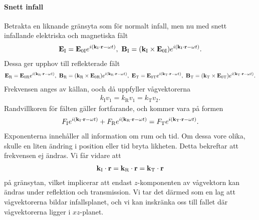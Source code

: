 \paragraph{Snett infall}
Betrakta en liknande gränsyta som för normalt infall, men nu med snett infallande elektriska och magnetiska fält
\begin{align*}
	\vb{E}_{\text{I}} = \vb{E}_{0\text{I}}e^{i(\vb{k}_{\text{I}}\cdot\vb{r} - \omega t)},\ \vb{B}_{\text{I}} = (\vb{k}_{\text{I}}\times\vb{E}_{0\text{I}})e^{i(\vb{k}_{\text{I}}\cdot\vb{r} - \omega t)}.
\end{align*}
Dessa ger upphov till reflekterade fält
\begin{align*}
	\vb{E}_{\text{R}} = \vb{E}_{0\text{R}}e^{i(\vb{k}_{\text{R}}\cdot\vb{r} - \omega t)},\ \vb{B}_{\text{R}} = (\vb{k}_{\text{R}}\times\vb{E}_{0\text{R}})e^{i(\vb{k}_{\text{R}}\cdot\vb{r} - \omega t)},\ \vb{E}_{\text{T}} = \vb{E}_{0\text{T}}e^{i(\vb{k}_{\text{T}}\cdot\vb{r} - \omega t)},\ \vb{B}_{\text{T}} = (\vb{k}_{\text{T}}\times\vb{E}_{0\text{T}})e^{i(\vb{k}_{\text{T}}\cdot\vb{r} - \omega t)}.
\end{align*}
Frekvensen anges av källan, ooch då uppfyller vågvektorerna
\begin{align*}
	k_{\text{I}}v_{1} = k_{\text{R}}v_{1} = k_{\text{T}}v_{2}.
\end{align*}
Randvillkoren för fälten gäller fortfarande, och kommer vara på formen
\begin{align*}
	F_{\text{I}}e^{i(\vb{k}_{\text{I}}\cdot\vb{r} - \omega t)} + F_{\text{R}}e^{i(\vb{k}_{\text{R}}\cdot\vb{r} - \omega t)} = F_{\text{T}}e^{i(\vb{k}_{\text{T}}\cdot\vb{r} - \omega t)}.
\end{align*}
Exponenterna innehåller all information om rum och tid. Om dessa vore olika, skulle en liten ändring i position eller tid bryta likheten. Detta bekreftar att frekvensen ej ändras. Vi får vidare att
\begin{align*}
	\vb{k}_{\text{I}}\cdot\vb{r} = \vb{k}_{\text{R}}\cdot\vb{r} = \vb{k}_{\text{T}}\cdot\vb{r}
\end{align*}
på gränsytan, vilket implicerar att endast $z$-komponenten av vågvektorn kan ändras under reflektion och transmission. Vi tar det därmed som en lag att vågvektorerna bildar infallsplanet, och vi kan inskränka oss till fallet där vågvektorerna ligger i $xz$-planet.

